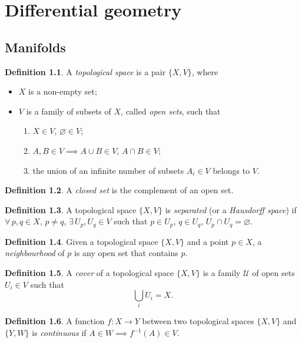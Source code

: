 \documentclass[a4paper,12pt]{book}
\theoremstyle{definition}
\newtheorem{definition}{Definition}
\theoremstyle{remark}
\begin{document}
\chapter{Differential geometry}


\section{Manifolds}

\begin{definition}
A \emph{topological space} is a pair $\{X,V\}$, where
\begin{itemize}
\item $X$ is a non-empty set;
\item $V$ is a family of subsets of $X$, called \emph{open sets}, such that
\begin{enumerate}
\item $X\in V$, $\varnothing\in V$;
\item $A,B\in V\implies A\cup B\in V$, $A\cap B\in V$;
\item the union of an infinite number of subsets $A_i\in V$ belongs to $V$.
\end{enumerate}
\end{itemize}
\end{definition}

\begin{definition}
A \emph{closed set} is the complement of an open set.
\end{definition}

\begin{definition}
A topological space $\{X,V\}$ is \emph{separated} (or a \emph{Hausdorff space}) if $\forall\, p,q\in X$, $p\ne q$, $\exists\, U_p,U_q\in V$ such that $p\in U_p$, $q\in U_q$, $U_p\cap U_q=\varnothing$.
\end{definition}

\begin{definition}
Given a topological space $\{X,V\}$ and a point $p\in X$, a \emph{neighbourhood} of $p$ is any open set that contains $p$.
\end{definition}

\begin{definition}
A \emph{cover} of a topological space $\{X,V\}$ is a family $\mathcal U$ of open sets $U_i\in V$ such that
\[\bigcup_i U_i=X.\]
\end{definition}

\begin{definition}
A function $f\colon X\to Y$ between two topological spaces $\{X,V\}$ and $\{Y,W\}$ is \emph{continuous} if $A\in W\implies f^{-1}(A)\in V$.
\end{definition}
\end{document}
